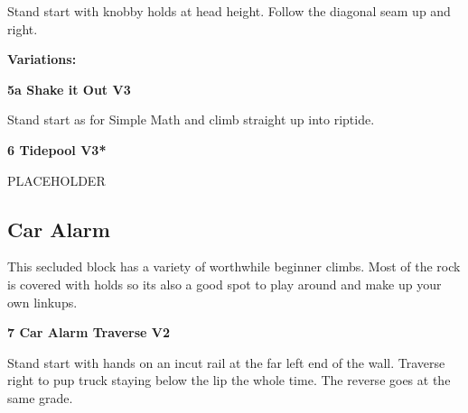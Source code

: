 \begin{multicols}{2}
			\begin{adjustwidth}{0.5cm}{}			
			Stand start with knobby holds at head height. Follow the diagonal seam up and right.
			\end{adjustwidth}
			
				\begin{adjustwidth}{0.5cm}{}				
				\needspace{3cm}
				\textbf{Variations:} \newline
					
					\needspace{1.5cm}
\label{vr:Shake it Out}
\colorbox{green!20}{
\parbox{0.95\linewidth}{
\textbf{
5a Shake it Out V3  
}}}

					\begin{adjustwidth}{0.5cm}{}			
					Stand start as for Simple Math and climb straight up into riptide.
					\end{adjustwidth}
					
					
				\end{adjustwidth}
			
			
			\needspace{1.5cm}
\label{rt:Tidepool}
\colorbox{green!20}{
\parbox{0.95\linewidth}{
\textbf{
6 Tidepool V3*  
}}}

			\begin{adjustwidth}{0.5cm}{}			
			PLACEHOLDER
			\end{adjustwidth}
			
			
\label{pt:Riptide}



		\needspace{1.5cm}
		\subsection*{Car Alarm}\label{bf:Car Alarm}
		This secluded block has a variety of worthwhile beginner climbs. Most of the rock is covered with holds so its also a good spot to play around and make up your own linkups.\\
	
		
			
			\needspace{1.5cm}
\label{rt:Car Alarm Traverse}
\colorbox{green!20}{
\parbox{0.95\linewidth}{
\textbf{
7 Car Alarm Traverse V2  
}}}

			\begin{adjustwidth}{0.5cm}{}			
			Stand start with hands on an incut rail at the far left end of the wall. Traverse right to pup truck staying below the lip the whole time. The reverse goes at the same grade.
			\end{adjustwidth}
			

\end{multicols}
